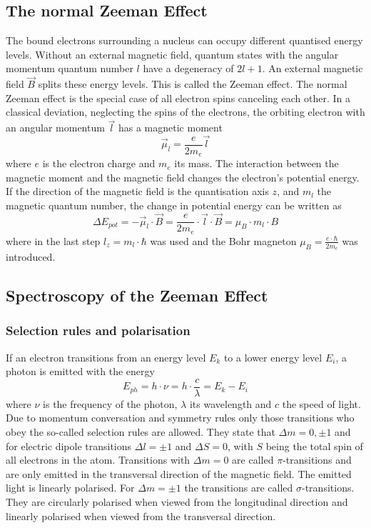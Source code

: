\documentclass[12pt]{article}
\begin{document}
\subsection{The normal Zeeman Effect}
The bound electrons surrounding a nucleus can occupy different quantised energy levels. Without an external magnetic field, quantum states with the angular momentum quantum number $l$ have a degeneracy of $2l+1$. An external magnetic field $\vec{B}$ splits these energy levels. This is called the Zeeman effect. The normal Zeeman effect is the special case of all electron spins canceling each other. In a classical deviation, neglecting the spins of the electrons, the orbiting electron with an angular momentum $\vec{l}$ has a magnetic moment
\begin{equation}
\vec{\mu}_l=\frac{e}{2m_e}\vec{l}
\end{equation}
where $e$ is the electron charge and $m_e$ its mass. The interaction between the magnetic moment and the magnetic field changes the electron's potential energy. If the direction of the magnetic field is the quantisation axis $z$, and $m_l$ the magnetic quantum number, the change in potential energy can be written as
\begin{equation}
\Delta E_{pot}=-\vec{\mu}_l\cdot \vec{B}=\frac{e}{2m_e}\cdot\vec{l}\cdot\vec{B}=\mu_B \cdot m_l \cdot B
\end{equation}
where in the last step $l_z=m_l\cdot\hbar$ was used and the Bohr magneton $\mu_B=\frac{e\cdot\hbar}{2m_e}$ was introduced.

\subsection{Spectroscopy of the Zeeman Effect}
\subsubsection{Selection rules and polarisation}
If an electron transitions from an energy level $E_k$ to a lower energy level $E_i$, a photon is emitted with the energy
\begin{equation}
E_{ph}=h \cdot \nu=h \cdot \frac{c}{\lambda}=E_k-E_i
\label{eq:photonenergy}
\end{equation}
where $\nu$ is the frequency of the photon, $\lambda$ its wavelength and $c$ the speed of light. Due to momentum conversation and symmetry rules only those transitions who obey the so-called selection rules are allowed. They state that $\Delta m=0,\pm1$ and for electric dipole transitions $\Delta l=\pm1$ and $\Delta S=0$, with $S$ being the total spin of all electrons in the atom. Transitions with $\Delta m=0$ are called $\pi$-transitions and are only emitted in the transversal direction of the magnetic field. The emitted light is linearly polarised. For $\Delta m=\pm1$ the transitions are called $\sigma$-transitions. They are circularly polarised when viewed from the longitudinal direction and linearly polarised when viewed from the transversal direction.
\end{document}

